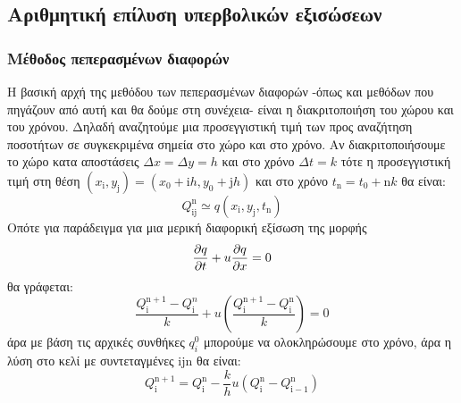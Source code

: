 


\subsection{Αριθμητική επίλυση υπερβολικών εξισώσεων}
\subsubsection{Μέθοδος πεπερασμένων διαφορών}
Η βασική αρχή της μεθόδου των πεπερασμένων διαφορών -όπως και μεθόδων που πηγάζουν από αυτή και θα δούμε στη συνέχεια- είναι η διακριτοποιήση του χώρου και του χρόνου. Δηλαδή αναζητούμε μια προσεγγιστική τιμή των προς αναζήτηση ποσοτήτων σε συγκεκριμένα σημεία στο χώρο και στο χρόνο. Αν διακριτοποιήσουμε το χώρο κατα αποστάσεις $\Delta x=\Delta y = h$ και στο χρόνο $\Delta t=k$ τότε η προσεγγιστική τιμή στη θέση $(x_\mathrm{i},y_\mathrm{j})=(x_0+\mathrm{i}h,y_0+\mathrm{j}h)$ και στο χρόνο $t_\mathrm{n}=t_0+\mathrm{n}k$ θα είναι:
\begin{equation}
Q_{\mathrm{ij}}^\mathrm{n }\simeq q(x_\mathrm{i},y_\mathrm{j},t_\mathrm{n})
\end{equation}
Οπότε για παράδειγμα για μια μερική διαφορική εξίσωση της μορφής
\begin{equation}
\pdv{q}{t}+u\pdv{q}{x}=0
\end{equation} 
θα γράφεται:
\begin{equation}
\frac{Q_\mathrm{i}^\mathrm{n+1}-Q_\mathrm{i}^n }{k} + u \left( \frac{Q_\mathrm{i}^\mathrm{n+1}-Q_\mathrm{i}^\mathrm{n} }{k}  \right) =0
\end{equation}
άρα με βάση τις αρχικές συνθήκες $q_i^0$ μπορούμε να ολοκληρώσουμε στο χρόνο, άρα η λύση στο κελί με συντεταγμένες $\mathrm{ijn}$ θα είναι:
\begin{equation}
Q_{\mathrm{i}}^\mathrm{n+1} = Q_{\mathrm{i}}^\mathrm{n} -\frac{k}{h} u \left( Q_\mathrm{i}^\mathrm{n} - Q_\mathrm{i-1}^\mathrm{n} \right)
\end{equation} 

